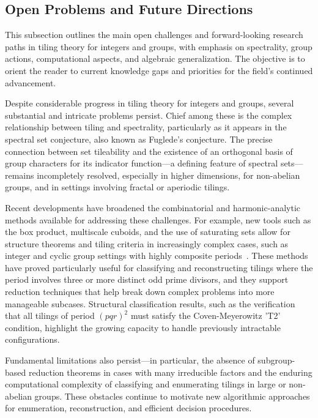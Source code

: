 \documentclass[sigconf]{acmart}
\begin{document}
\subsection{Open Problems and Future Directions}

This subsection outlines the main open challenges and forward-looking research paths in tiling theory for integers and groups, with emphasis on spectrality, group actions, computational aspects, and algebraic generalization. The objective is to orient the reader to current knowledge gaps and priorities for the field's continued advancement.

Despite considerable progress in tiling theory for integers and groups, several substantial and intricate problems persist. Chief among these is the complex relationship between tiling and spectrality, particularly as it appears in the spectral set conjecture, also known as Fuglede’s conjecture. The precise connection between set tileability and the existence of an orthogonal basis of group characters for its indicator function—a defining feature of spectral sets—remains incompletely resolved, especially in higher dimensions, for non-abelian groups, and in settings involving fractal or aperiodic tilings.

Recent developments have broadened the combinatorial and harmonic-analytic methods available for addressing these challenges. For example, new tools such as the box product, multiscale cuboids, and the use of saturating sets allow for structure theorems and tiling criteria in increasingly complex cases, such as integer and cyclic group settings with highly composite periods~\cite{ref101}. These methods have proved particularly useful for classifying and reconstructing tilings where the period involves three or more distinct odd prime divisors, and they support reduction techniques that help break down complex problems into more manageable subcases. Structural classification results, such as the verification that all tilings of period $(pqr)^2$ must satisfy the Coven-Meyerowitz 'T2' condition, highlight the growing capacity to handle previously intractable configurations.

Fundamental limitations also persist—in particular, the absence of subgroup-based reduction theorems in cases with many irreducible factors and the enduring computational complexity of classifying and enumerating tilings in large or non-abelian groups. These obstacles continue to motivate new algorithmic approaches for enumeration, reconstruction, and efficient decision procedures.
\end{document}
